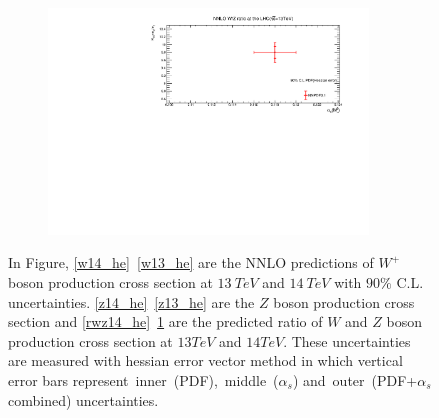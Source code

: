 \begin{figure}[H]
\begin{subfigure}{0.49\textwidth}
\includegraphics[height=6cm, width=\textwidth]{chapter4/Rwz_hessian13.pdf}
\vspace*{-8mm}
\caption{}
\label{rwz13_he}
\end{subfigure}
\caption{In Figure, \ref{w14_he}~\ref{w13_he} are the NNLO predictions of $W^{+}$ boson production cross section at $13~TeV$ and $14~TeV$ with $90\%$ C.L. uncertainties. \ref{z14_he}~\ref{z13_he} are the $Z$ boson production cross section and \ref{rwz14_he}~\ref{rwz13_he} are the predicted ratio of $W$ and $Z$ boson production cross section at $13TeV$ and $14TeV$. These uncertainties are measured with hessian error vector method in which vertical error bars represent~inner~(PDF),~middle~($\alpha_{s}$) and~outer~(PDF+$\alpha_{s}$ combined) uncertainties.} 
\label{13tev4}
\end{figure}



